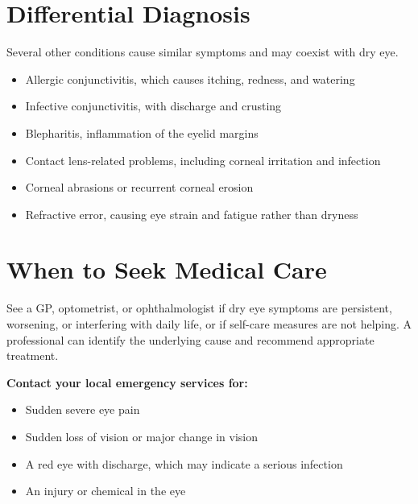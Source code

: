 \section*{Differential Diagnosis}
Several other conditions cause similar symptoms and may coexist with dry eye.
\begin{itemize}
    \item Allergic conjunctivitis, which causes itching, redness, and watering
    \item Infective conjunctivitis, with discharge and crusting
    \item Blepharitis, inflammation of the eyelid margins
    \item Contact lens-related problems, including corneal irritation and infection
    \item Corneal abrasions or recurrent corneal erosion
    \item Refractive error, causing eye strain and fatigue rather than dryness
\end{itemize}

\section*{When to Seek Medical Care}
See a GP, optometrist, or ophthalmologist if dry eye symptoms are persistent, worsening, or interfering with daily life, or if self-care measures are not helping. A professional can identify the underlying cause and recommend appropriate treatment.

\textbf{Contact your local emergency services for:}
\begin{itemize}
    \item Sudden severe eye pain
    \item Sudden loss of vision or major change in vision
    \item A red eye with discharge, which may indicate a serious infection
    \item An injury or chemical in the eye
\end{itemize}

